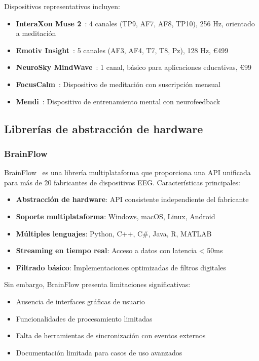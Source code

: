 Dispositivos representativos incluyen:
\begin{itemize}
    \item \textbf{InteraXon Muse 2}~\cite{muse_2}: 4 canales (TP9, AF7, AF8, TP10), 256 Hz, orientado a meditación
    \item \textbf{Emotiv Insight}~\cite{emotiv_insight}: 5 canales (AF3, AF4, T7, T8, Pz), 128 Hz, €499
    \item \textbf{NeuroSky MindWave}~\cite{neurosky_mindwave}: 1 canal, básico para aplicaciones educativas, €99
    \item \textbf{FocusCalm}~\cite{focuscalm}: Dispositivo de meditación con suscripción mensual
    \item \textbf{Mendi}~\cite{mendi}: Dispositivo de entrenamiento mental con neurofeedback
\end{itemize}

\subsection{Librerías de abstracción de hardware}
\label{subsec:librerias_hardware}

\subsubsection{BrainFlow}
BrainFlow~\cite{brainflow} es una librería multiplataforma que proporciona una API unificada para más de 20 fabricantes de dispositivos EEG. Características principales:

\begin{itemize}
    \item \textbf{Abstracción de hardware}: API consistente independiente del fabricante
    \item \textbf{Soporte multiplataforma}: Windows, macOS, Linux, Android
    \item \textbf{Múltiples lenguajes}: Python, C++, C\#, Java, R, MATLAB
    \item \textbf{Streaming en tiempo real}: Acceso a datos con latencia < 50ms
    \item \textbf{Filtrado básico}: Implementaciones optimizadas de filtros digitales
\end{itemize}

Sin embargo, BrainFlow presenta limitaciones significativas:
\begin{itemize}
    \item Ausencia de interfaces gráficas de usuario
    \item Funcionalidades de procesamiento limitadas
    \item Falta de herramientas de sincronización con eventos externos
    \item Documentación limitada para casos de uso avanzados
\end{itemize}

